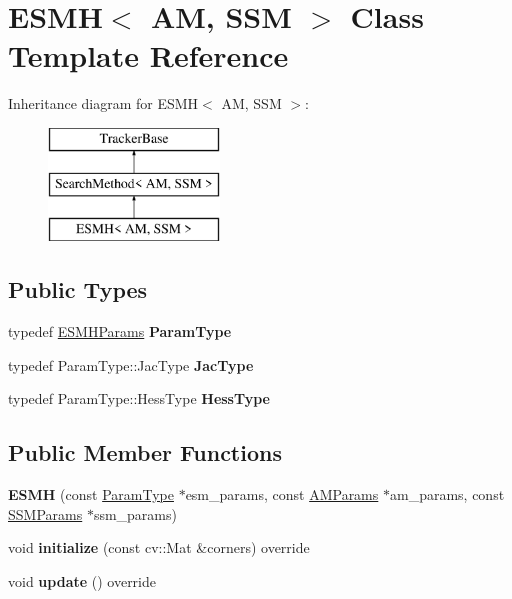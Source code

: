 \hypertarget{classESMH}{\section{E\-S\-M\-H$<$ A\-M, S\-S\-M $>$ Class Template Reference}
\label{classESMH}
}
Inheritance diagram for E\-S\-M\-H$<$ A\-M, S\-S\-M $>$\-:\begin{figure}[H]
\begin{center}
\leavevmode
\includegraphics[height=3.000000cm]{classESMH}
\end{center}
\end{figure}
\subsection*{Public Types}
\begin{DoxyCompactItemize}
\item 
\hypertarget{classESMH_a462c285889008b4f0bb90e5cb9999209}{typedef \hyperlink{structESMHParams}{E\-S\-M\-H\-Params} {\bfseries Param\-Type}}\label{classESMH_a462c285889008b4f0bb90e5cb9999209}

\item 
\hypertarget{classESMH_ade5807b653259fc6e359dd66c5ea2832}{typedef Param\-Type\-::\-Jac\-Type {\bfseries Jac\-Type}}\label{classESMH_ade5807b653259fc6e359dd66c5ea2832}

\item 
\hypertarget{classESMH_aa2ecca0f297a5943d2caab8e733f497e}{typedef Param\-Type\-::\-Hess\-Type {\bfseries Hess\-Type}}\label{classESMH_aa2ecca0f297a5943d2caab8e733f497e}

\end{DoxyCompactItemize}
\subsection*{Public Member Functions}
\begin{DoxyCompactItemize}
\item 
\hypertarget{classESMH_a43853036da62afbc048847b9b0525bf6}{{\bfseries E\-S\-M\-H} (const \hyperlink{structESMHParams}{Param\-Type} $\ast$esm\-\_\-params, const \hyperlink{structAMParams}{A\-M\-Params} $\ast$am\-\_\-params, const \hyperlink{structSSMParams}{S\-S\-M\-Params} $\ast$ssm\-\_\-params)}\label{classESMH_a43853036da62afbc048847b9b0525bf6}

\item 
\hypertarget{classESMH_a2655fedddfaa8c11bbebf36fc7d99435}{void {\bfseries initialize} (const cv\-::\-Mat \&corners) override}\label{classESMH_a2655fedddfaa8c11bbebf36fc7d99435}

\item 
\hypertarget{classESMH_ac308eb0f0003c2b3cb515b0d4874db10}{void {\bfseries update} () override}\label{classESMH_ac308eb0f0003c2b3cb515b0d4874db10}

\end{DoxyCompactItemize}
